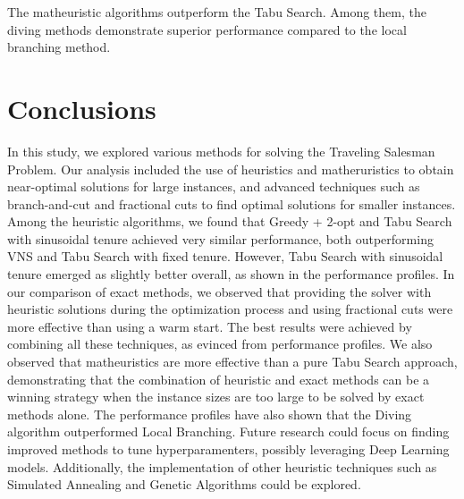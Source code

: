 \documentclass{article}
\begin{document}
The matheuristic algorithms outperform the Tabu Search.
Among them, the diving methods demonstrate superior performance compared to the local branching method.

\clearpage
\newpage

\section{Conclusions}
In this study, we explored various methods for solving the Traveling Salesman Problem.
Our analysis included the use of heuristics and matheruristics to obtain near-optimal
solutions for large instances, and advanced techniques such as branch-and-cut and
fractional cuts to find optimal solutions for smaller instances.
Among the heuristic algorithms, we found that Greedy + 2-opt and Tabu Search with
sinusoidal tenure achieved very similar performance, both outperforming VNS and Tabu Search
with fixed tenure.
However, Tabu Search with sinusoidal tenure emerged as slightly better overall,
as shown in the performance profiles.
In our comparison of exact methods, we observed that providing the solver with heuristic solutions
during the optimization process and using fractional cuts
were more effective than using a warm start.
The best results were achieved by combining all these techniques, as evinced from
performance profiles.
We also observed that matheuristics are more effective than a pure Tabu Search approach,
demonstrating that the combination of heuristic and exact methods can be a winning
strategy when the instance sizes are too large to be solved by exact methods alone.
The performance profiles have also shown that the Diving algorithm outperformed Local Branching.
Future research could focus on finding improved methods to tune hyperparamenters,
possibly leveraging Deep Learning models.
Additionally, the implementation of other heuristic techniques such as Simulated
Annealing and Genetic Algorithms could be explored.

\clearpage
\newpage



\end{document}
